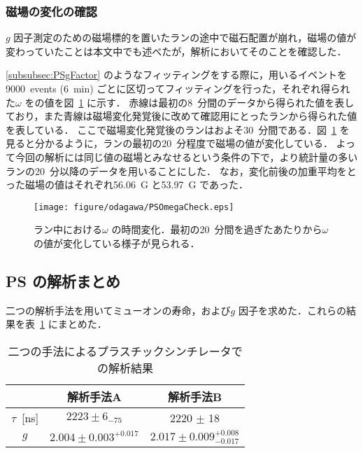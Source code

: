 \subsubsection{磁場の変化の確認}
\label{subsubsec:PSMagChangeCheck}

$g$ 因子測定のための磁場標的を置いたランの途中で磁石配置が崩れ，磁場の値が変わっていたことは本文中でも述べたが，解析においてそのことを確認した．

\ref{subsubsec:PSgFactor} のようなフィッティングをする際に，用いるイベントを9000~events (6~min) ごとに区切ってフィッティングを行った，それぞれ得られた$\omega$ をの値を図~\ref{fig:PSOmegaCheck} に示す．
赤線は最初の8~分間のデータから得られた値を表しており，また青線は磁場変化発覚後に改めて確認用にとったランから得られた値を表している．
ここで磁場変化発覚後のランはおよそ30~分間である．図~\ref{fig:PSOmegaCheck} を見ると分かるように，ランの最初の20~分程度で磁場の値が変化している．
よって今回の解析には同じ値の磁場とみなせるという条件の下で，より統計量の多いランの20~分以降のデータを用いることにした．
なお，変化前後の加重平均をとった磁場の値はそれぞれ56.06~G と53.97~G であった．
\begin{figure}[h]
	\centering
	\texttt{[image: figure/odagawa/PSOmegaCheck.eps]}
	\caption{ラン中における$\omega$ の時間変化．最初の20~分間を過ぎたあたりから$\omega$ の値が変化している様子が見られる．}
	\label{fig:PSOmegaCheck}
\end{figure}

\subsection{PS の解析まとめ}
\label{subsec:PSmatome}

二つの解析手法を用いてミューオンの寿命，および$g$ 因子を求めた．これらの結果を表~\ref{tab:matome_PS} にまとめた．
\begin{table}[h]
	\centering
	\caption{二つの手法によるプラスチックシンチレータでの解析結果}
	\begin{tabular}{ccc}\toprule
	{} & 解析手法A & 解析手法B \\ \midrule
	$\tau$~[ns]& $2223 \pm 6_{- 75}$ & 2220 $\pm$ 18\\
	$g$ & $2.004 \pm 0.003^{+0.017}$  & $2.017 \pm 0.009 ^{+0.008}_{-0.017}$\\ \bottomrule
	\end{tabular}\label{tab:matome_PS}
\end{table}%



%
